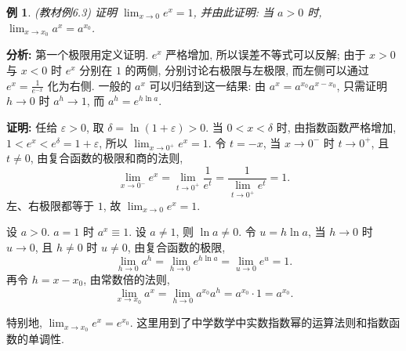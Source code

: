 \documentclass[UTF8,openany]{ctexbook}
\theoremstyle{chinesetextbook}
\newtheorem{example}{例}[section]
\newenvironment{cnproof}{\par\indent\textbf{证明:} \ignorespaces}{\par}
\begin{document}
\begin{example}
\textnormal{(教材例6.3)} 证明 $\displaystyle\lim_{x\to0}e^x=1$, 并由此证明: 当 $a>0$ 时, $\displaystyle\lim_{x\to x_0}a^x=a^{x_0}$.
\end{example}
\par\indent\textbf{分析:} 第一个极限用定义证明. $e^x$ 严格增加, 所以误差不等式可以反解; 由于 $x>0$ 与 $x<0$ 时 $e^x$ 分别在 $1$ 的两侧, 分别讨论右极限与左极限, 而左侧可以通过 $\displaystyle e^x=\frac1{e^{-x}}$ 化为右侧. 一般的 $a^x$ 可以归结到这一结果: 由 $a^x=a^{x_0}a^{x-x_0}$, 只需证明 $h\to0$ 时 $a^h\to1$, 而 $a^h=e^{h\ln a}$.
\begin{cnproof}
任给 $\varepsilon>0$, 取 $\delta=\ln(1+\varepsilon)>0$. 当 $0<x<\delta$ 时, 由指数函数严格增加, $1<e^x<e^\delta=1+\varepsilon$, 所以 $\displaystyle\lim_{x\to0^+}e^x=1$. 令 $t=-x$, 当 $x\to0^-$ 时 $t\to0^+$, 且 $t\ne0$, 由复合函数的极限和商的法则,
\[
\lim_{x\to0^-}e^x=\lim_{t\to0^+}\frac1{e^t}=\frac1{\displaystyle\lim_{t\to0^+}e^t}=1.
\]
左、右极限都等于 $1$, 故 $\displaystyle\lim_{x\to0}e^x=1$.

设 $a>0$. $a=1$ 时 $a^x\equiv1$. 设 $a\ne1$, 则 $\ln a\ne0$. 令 $u=h\ln a$, 当 $h\to0$ 时 $u\to0$, 且 $h\ne0$ 时 $u\ne0$, 由复合函数的极限,
\[
\lim_{h\to0}a^h=\lim_{h\to0}e^{h\ln a}=\lim_{u\to0}e^u=1.
\]
再令 $h=x-x_0$, 由常数倍的法则,
\[
\lim_{x\to x_0}a^x=\lim_{h\to0}a^{x_0}a^h=a^{x_0}\cdot1=a^{x_0}.
\]
\end{cnproof}
特别地, $\displaystyle\lim_{x\to x_0}e^x=e^{x_0}$. 这里用到了中学数学中实数指数幂的运算法则和指数函数的单调性.
\end{document}
